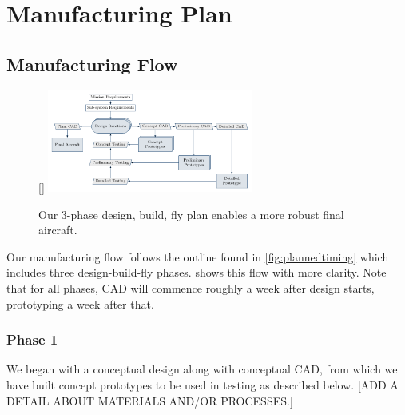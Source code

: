 
 \section{Manufacturing Plan} %
\label{sec:ManufacturingPlan}


\subsection{Manufacturing Flow}
\label{ssec:ManufacturingFlow}

\begin{figure}
	\centering
	\raisebox{0pt}[\dimexpr{}\baselineskip\relax]{ %
		\includegraphics[width=0.6\textwidth]{manufacturing_flow}
	} %
	\caption{Our 3-phase design, build, fly plan enables a more robust final aircraft.}
	\label{fig:manufacturingplan}
\end{figure}

Our manufacturing flow follows the outline found in \cref{fig:plannedtiming} which includes three design-build-fly phases.   shows this flow with more clarity.  Note that for all phases, CAD will commence roughly a week after design starts, prototyping a week after that.

\subsubsection{Phase 1} We began with a conceptual design along with conceptual CAD, from which we have built concept prototypes to be used in testing as described below. {\color{BYUred}[ADD A DETAIL ABOUT MATERIALS AND/OR PROCESSES.]}

